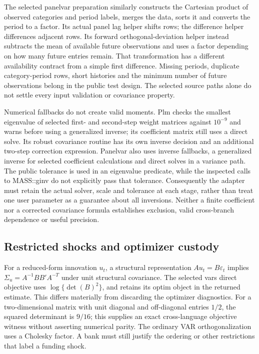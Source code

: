 The selected panelvar preparation similarly constructs the Cartesian product of observed categories and period labels, merges the data, sorts it and converts the period to a factor. Its actual panel lag helper shifts rows; the difference helper differences adjacent rows. Its forward orthogonal-deviation helper instead subtracts the mean of available future observations and uses a factor depending on how many future entries remain. That transformation has a different availability contract from a simple first difference. Missing periods, duplicate category-period rows, short histories and the minimum number of future observations belong in the public test design. The selected source paths alone do not settle every input validation or covariance property.\citep{exec25_rdyn_panelvar}

Numerical fallbacks do not create valid moments. Plm checks the smallest eigenvalue of selected first- and second-step weight matrices against $10^{-9}$ and warns before using a generalized inverse; its coefficient matrix still uses a direct solve. Its robust covariance routine has its own inverse decision and an additional two-step correction expression. Panelvar also uses inverse fallbacks, a generalized inverse for selected coefficient calculations and direct solves in a variance path. The public tolerance is used in an eigenvalue predicate, while the inspected calls to MASS::ginv do not explicitly pass that tolerance. Consequently the adapter must retain the actual solver, scale and tolerance at each stage, rather than treat one user parameter as a guarantee about all inversions. Neither a finite coefficient nor a corrected covariance formula establishes exclusion, valid cross-branch dependence or useful precision.\citep{exec25_rdyn_plm,exec25_rdyn_panelvar}

\subsection{Restricted shocks and optimizer custody}

For a reduced-form innovation $u_t$, a structural representation $Au_t=B\varepsilon_t$ implies $\Sigma_u=A^{-1}BB'A^{-T}$ under unit structural covariance. The selected vars direct objective uses $\log\{\det(B)^2\}$, and retains its optim object in the returned estimate. This differs materially from discarding the optimizer diagnostics. For a two-dimensional matrix with unit diagonal and off-diagonal entries $1/2$, the squared determinant is $9/16$; this supplies an exact cross-language objective witness without asserting numerical parity. The ordinary VAR orthogonalization uses a Cholesky factor. A bank must still justify the ordering or other restrictions that label a funding shock.\citep{exec25_rdyn_vars,exec25_rdyn_choice}

